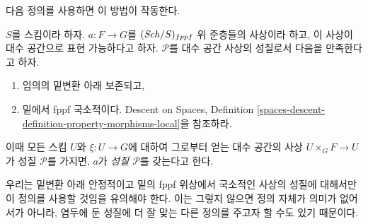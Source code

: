 \noindent
다음 정의를 사용하면 이 방법이 작동한다.

\begin{definition}
\label{definition-property-transformation}
$S$를 스킴이라 하자. $a : F \to G$를 $(\mathit{Sch}/S)_{fppf}$ 위 준층들의
사상이라 하고, 이 사상이 대수 공간으로 표현 가능하다고 하자.
$\mathcal{P}$를 대수 공간 사상의 성질로서 다음을 만족한다고 하자.
\begin{enumerate}
\item 임의의 밑변환 아래 보존되고,
\item 밑에서 fppf 국소적이다. Descent on Spaces,
Definition \ref{spaces-descent-definition-property-morphisms-local}을 참조하라.
\end{enumerate}
이때 모든 스킴 $U$와 $\xi : U \to G$에 대하여 그로부터 얻는 대수
공간의 사상 $U \times_G F \to U$가 성질 $\mathcal{P}$를 가지면,
$a$가 {\it 성질 $\mathcal{P}$}를 갖는다고 한다.
\end{definition}

\noindent
우리는 밑변환 아래 안정적이고 밑의 fppf 위상에서 국소적인 사상의
성질에 대해서만 이 정의를 사용할 것임을 유의해야 한다. 이는 그렇지
않으면 정의 자체가 의미가 없어서가 아니라, 염두에 둔 성질에 더 잘
맞는 다른 정의를 주고자 할 수도 있기 때문이다.

